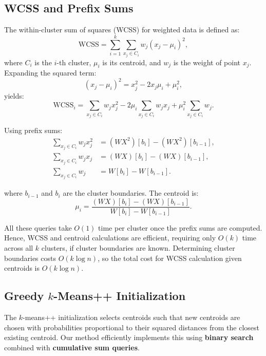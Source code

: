 \subsection{WCSS and Prefix Sums}

The within-cluster sum of squares (WCSS) for weighted data is defined as:
\[
\text{WCSS} = \sum_{i=1}^k \sum_{x_j \in C_i} w_j (x_j - \mu_i)^2,
\]
where \(C_i\) is the \(i\)-th cluster, \(\mu_i\) is its centroid, and \(w_j\) is the weight of point \(x_j\). Expanding the squared term:
\[
(x_j - \mu_i)^2 = x_j^2 - 2x_j\mu_i + \mu_i^2,
\]
yields:
\[
\text{WCSS}_i = \sum_{x_j \in C_i} w_j x_j^2 - 2\mu_i \sum_{x_j \in C_i} w_j x_j + \mu_i^2 \sum_{x_j \in C_i} w_j.
\]

Using prefix sums:
\[
\begin{aligned}
\sum_{x_j \in C_i} w_j x_j^2 &= (WX^2)[b_i] - (WX^2)[b_{i-1}], \\
\sum_{x_j \in C_i} w_j x_j &= (WX)[b_i] - (WX)[b_{i-1}], \\
\sum_{x_j \in C_i} w_j &= W[b_i] - W[b_{i-1}].
\end{aligned}
\]

where \(b_{i-1}\) and \(b_i\) are the cluster boundaries. The centroid is:
\[
\mu_i = \frac{(WX)[b_i] - (WX)[b_{i-1}]}{W[b_i] - W[b_{i-1}]}.
\]

All these queries take \(O(1)\) time per cluster once the prefix sums are computed. Hence, WCSS and centroid calculations are efficient, requiring only \(O(k)\) time across all $k$ clusters, if cluster boundaries are known. Determining cluster boundaries costs \(O(k \log n)\), so the total cost for WCSS calculation given centroids is \(O(k \log n)\).

\subsection{Greedy $k$-Means++ Initialization}

The $k$-means++ initialization selects centroids such that new centroids are chosen with probabilities proportional to their squared distances from the closest existing centroid. Our method efficiently implements this using \textbf{binary search} combined with \textbf{cumulative sum queries}.

